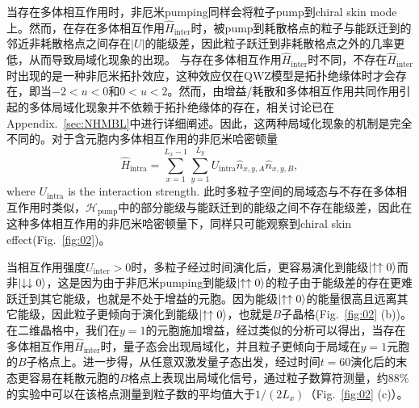 \documentclass[longbibliography, aps, prx, amsmath, amssymb, amsfonts, twocolumn,superscriptaddress, footinbib]{revtex4-1}
\begin{document}
	当存在多体相互作用时，非厄米pumping同样会将粒子pump到chiral skin mode上。然而，在存在多体相互作用$\hat{H}_{\text{inter}}$时，被pump到耗散格点的粒子与能跃迁到的邻近非耗散格点之间存在$\vert U \vert$的能级差，因此粒子跃迁到非耗散格点之外的几率更低，从而导致局域化现象的出现。
	与存在多体相互作用$\hat{H}_{\text{inter}}$时不同，不存在$\hat{H}_{\text{inter}}$时出现的是一种非厄米拓扑效应，这种效应仅在QWZ模型是拓扑绝缘体时才会存在，即当$-2<u<0$和$0<u<2$。然而，由增益/耗散和多体相互作用共同作用引起的多体局域化现象并不依赖于拓扑绝缘体的存在，相关讨论已在Appendix.~\ref{sec:NHMBL}中进行详细阐述。因此，这两种局域化现象的机制是完全不同的。对于含元胞内多体相互作用的非厄米哈密顿量
	\begin{equation}
		\hat{H}_{\text{intra}} = \sum_{{x}=1}^{L_{x}-1} \sum_{{y}=1}^{L_{y}}  U_{\text{intra}} \hat{n}_{{x}, {y}, A} \hat{n}_{{x}, {y}, B},
	\end{equation}
	where $U_{\text{intra}}$ is the interaction strength. 
	此时多粒子空间的局域态与不存在多体相互作用时类似，$\mathscr{H}_{\text{pump}}$中的部分能级与能跃迁到的能级之间不存在能级差，因此在这种多体相互作用的非厄米哈密顿量下，同样只可能观察到chiral skin effect(Fig.~\ref{fig:02})。

	当相互作用强度$U_{\text{inter}}>0$时，多粒子经过时间演化后，更容易演化到能级$\ket{\uparrow\uparrow0}$而非$\ket{\downarrow\downarrow0}$，这是因为由于非厄米pumping到能级$\ket{\uparrow\uparrow0}$的粒子由于能级差的存在更难跃迁到其它能级，也就是不处于增益的元胞。因为能级$\ket{\uparrow\uparrow0}$的能量很高且远离其它能级，因此粒子更倾向于演化到能级$\ket{\uparrow\uparrow0}$，也就是$B$子晶格(Fig.~\ref{fig:02} (b))。
	在二维晶格中，我们在$y=1$的元胞施加增益，经过类似的分析可以得出，当存在多体相互作用$\hat{H}_{\text{inter}}$时，量子态会出现局域化，并且粒子更倾向于局域在$y=1$元胞的$B$子格点上。进一步得，从任意双激发量子态出发，经过时间$t=60$演化后的末态更容易在耗散元胞的$B$格点上表现出局域化信号，通过粒子数算符测量，约$88\%$的实验中可以在该格点测量到粒子数的平均值大于$1/(2L_x)$（Fig.~\ref{fig:02} (c)）。
\end{document}
